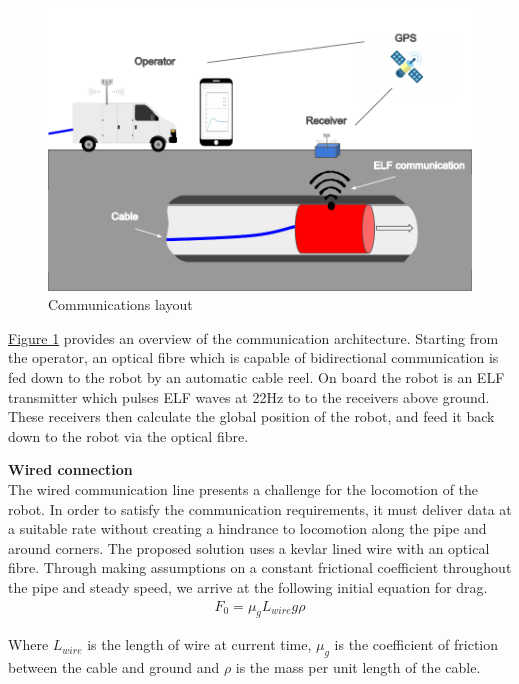 \documentclass[11pt]{article}		%
\begin{document}
        \begin{figure}[h]
			\centering
			\includegraphics[scale=1]{comms layout.pdf}
			\caption{Communications layout}
			\label{commsLayout}
		\end{figure}
        
        \hyperref[commsLayout]{Figure \ref*{commsLayout}} provides an overview of the communication architecture. 
        Starting from the operator, an optical fibre which is capable of bidirectional communication is fed down to the robot by an automatic cable reel. 
        On board the robot is an ELF transmitter which pulses ELF waves at 22Hz to to the receivers above ground. 
        These receivers then calculate the global position of the robot, and feed it back down to the robot via the optical fibre.
       
        \textbf{Wired connection}
        \\
        The wired communication line presents a challenge for the locomotion of the robot. 
        In order to satisfy the communication requirements, it must deliver data at a suitable rate without creating a hindrance to locomotion along the pipe and around corners. 
        The proposed solution uses a kevlar lined wire with an optical fibre. 
        Through making assumptions on a constant frictional coefficient throughout the pipe and steady speed, we arrive at the following initial equation for drag. 
        \begin{align}
				F_0 = \mu_g L_{wire}   g \rho
		\end{align}
        
        
        Where $L_{wire}$ is the length of wire at current time, $\mu_g$ is the coefficient of friction between the cable and ground and $\rho$ is the mass per unit length of the cable.
        
\end{document}
